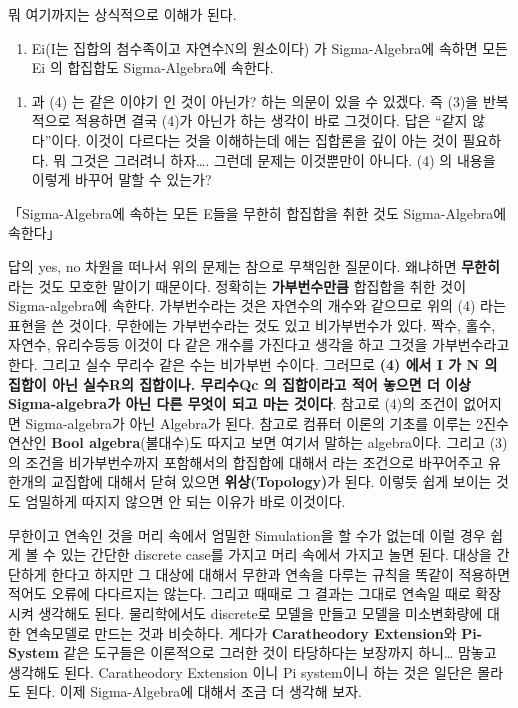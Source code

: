 \documentclass[
]{book}
\providecommand{\tightlist}{%
  \setlength{\itemsep}{0pt}\setlength{\parskip}{0pt}}
\begin{document}
{{{뭐 여기까지는 상식적으로 이해가 된다.

\begin{enumerate}
\def\labelenumi{\arabic{enumi}.}
\setcounter{enumi}{3}
\tightlist
\item
  Ei(I는 집합의 첨수족이고 자연수N의 원소이다) 가 Sigma-Algebra에 속하면 모든 Ei 의 합집합도 Sigma-Algebra에 속한다.
\end{enumerate}

\begin{enumerate}
\def\labelenumi{(\arabic{enumi})}
\setcounter{enumi}{2}
\tightlist
\item
  과 (4) 는 같은 이야기 인 것이 아닌가? 하는 의문이 있을 수 있겠다. 즉 (3)을 반복적으로 적용하면 결국 (4)가 아닌가 하는 생각이 바로 그것이다. 답은 ``같지 않다''이다. 이것이 다르다는 것을 이해하는데 에는 집합론을 깊이 아는 것이 필요하다. 뭐 그것은 그러려니 하자\ldots. 그런데 문제는 이것뿐만이 아니다. (4) 의 내용을 이렇게 바꾸어 말할 수 있는가?
\end{enumerate}

「Sigma-Algebra에 속하는 모든 E들을 무한히 합집합을 취한 것도 Sigma-Algebra에 속한다」

답의 yes, no 차원을 떠나서 위의 문제는 참으로 무책임한 질문이다. 왜냐하면 \textbf{무한히} 라는 것도 모호한 말이기 때문이다. 정확히는 \textbf{가부번수만큼} 합집합을 취한 것이 Sigma-algebra에 속한다. 가부번수라는 것은 자연수의 개수와 같으므로 위의 (4) 라는 표현을 쓴 것이다. 무한에는 가부번수라는 것도 있고 비가부번수가 있다. 짝수, 홀수, 자연수, 유리수등등 이것이 다 같은 개수를 가진다고 생각을 하고 그것을 가부번수라고 한다. 그리고 실수 무리수 같은 수는 비가부번 수이다. 그러므로 \textbf{(4) 에서 I 가 N 의 집합이 아닌 실수R의 집합이나. 무리수Qc 의 집합이라고 적어 놓으면 더 이상 Sigma-algebra가 아닌 다른 무엇이 되고 마는 것이다}.
참고로 (4)의 조건이 없어지면 Sigma-algebra가 아닌 Algebra가 된다. 참고로 컴퓨터 이론의 기초를 이루는 2진수 연산인 \textbf{Bool algebra}(불대수)도 따지고 보면 여기서 말하는 algebra이다. 그리고 (3) 의 조건을 비가부번수까지 포함해서의 합집합에 대해서 라는 조건으로 바꾸어주고 유한개의 교집합에 대해서 닫혀 있으면 \textbf{위상(Topology)}가 된다. 이렇듯 쉽게 보이는 것도 엄밀하게 따지지 않으면 안 되는 이유가 바로 이것이다.

무한이고 연속인 것을 머리 속에서 엄밀한 Simulation을 할 수가 없는데 이럴 경우 쉽게 볼 수 있는 간단한 discrete case를 가지고 머리 속에서 가지고 놀면 된다. 대상을 간단하게 한다고 하지만 그 대상에 대해서 무한과 연속을 다루는 규칙을 똑같이 적용하면 적어도 오류에 다다르지는 않는다. 그리고 때때로 그 결과는 그대로 연속일 때로 확장시켜 생각해도 된다. 물리학에서도 discrete로 모델을 만들고 모델을 미소변화량에 대한 연속모델로 만드는 것과 비슷하다. 게다가 \textbf{Caratheodory Extension}와 \textbf{Pi-System} 같은 도구들은 이론적으로 그러한 것이 타당하다는 보장까지 하니\ldots{} 맘놓고 생각해도 된다. Caratheodory Extension 이니 Pi system이니 하는 것은 일단은 몰라도 된다. 이제 Sigma-Algebra에 대해서 조금 더 생각해 보자.

}}}
\end{document}
